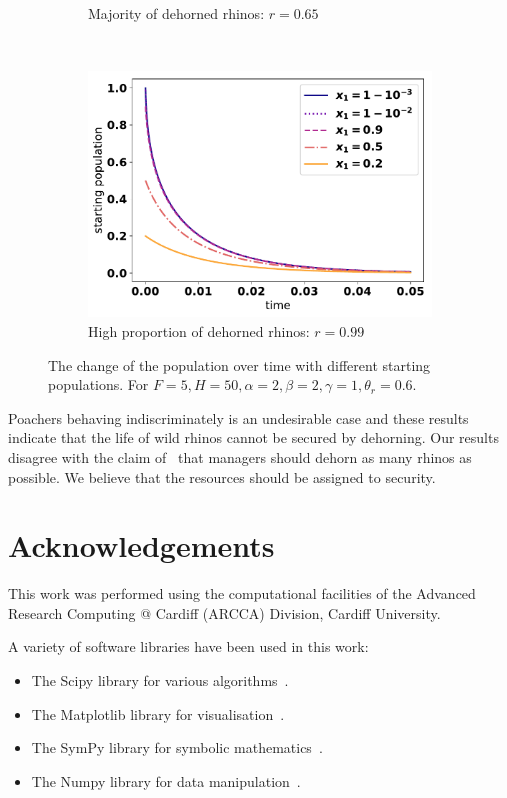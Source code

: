 \documentclass[10pt]{article}
\begin{document}
\begin{figure}[!htbp]
\begin{subfigure}{.3\textwidth}
    \caption{Majority of dehorned rhinos: \(r=0.65\)}
    \end{subfigure}%
    ~
    \begin{subfigure}{.3\textwidth}
    \includegraphics[width=\textwidth]{images/IndiscriminateESS-high-r.pdf}
    \caption{High proportion of dehorned rhinos: \(r=0.99\)}
    \end{subfigure}%
    \caption{\label{fig:indiscriminate_ess} The change of the population over 
    time with different starting populations. For \(F=5, H=50,  
    \alpha=2, \beta=2, \gamma=1, \theta_r=0.6\).}
\end{figure}

Poachers behaving indiscriminately is an undesirable case and these results
indicate that the life of
wild rhinos cannot be secured by dehorning. Our results disagree with the
claim of~\cite{Milner1992} that managers should dehorn
as many rhinos as possible. We believe that the resources should be 
assigned to security.

\section*{Acknowledgements}

This work was performed using the computational facilities of the Advanced
Research Computing @ Cardiff (ARCCA) Division, Cardiff University.

A variety of software libraries have been used in this work:

\begin{itemize}
    \item The Scipy library for various algorithms~\cite{scipy}.
    \item The Matplotlib library for visualisation~\cite{hunter2007matplotlib}.
    \item The SymPy library for symbolic mathematics~\cite{sympy}.
    \item The Numpy library for data manipulation~\cite{walt2011numpy}.
\end{itemize}




\end{document}
